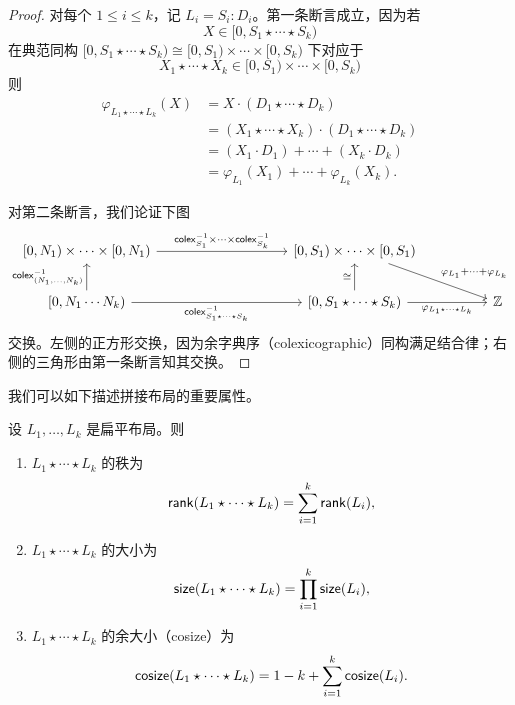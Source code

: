 \begin{proof}
    对每个 $1 \leq i \leq k$，记 $L_i = S_i:D_i$。第一条断言成立，因为若
    \[X \in [0,S_1 \star \cdots \star S_k)\]
    在典范同构 $[0,S_1 \star \cdots \star S_k) \cong [0,S_1) \times \cdots \times [0,S_k)$ 下对应于
    \[
    X_1 \star \cdots \star X_k \in [0,S_1) \times \cdots \times [0,S_k)
    \]
    则
    \begin{align*}
        \varphi_{L_1 \star \cdots \star L_k}(X) & = X \cdot (D_1 \star \cdots \star D_k)\\
        & = (X_1 \star \cdots \star X_k) \cdot (D_1 \star \cdots \star D_k)\\
        & = (X_1 \cdot D_1) + \cdots + (X_k \cdot D_k)\\
        & = \varphi_{L_1}(X_1) + \cdots + \varphi_{L_k}(X_k).
    \end{align*}

    对第二条断言，我们论证下图
    \[\begin{tikzcd} [row sep = 20]
    {[}0,N_1 {)} \times \cdots \times {[}0,N_1 {)} \ar[rrrr,"\colex_{S_1}^{-1} \times \cdots \times \colex_{S_k}^{-1} "] & & & & {[}0,S_1 {)} \times \cdots \times {[}0,S_1 {)} \ar[drr,"\varphi_{L_1} + \cdots + \varphi_{L_k}"] & & \\
    {[}0,N_1 \cdots N_k {)} \ar[u,"\colex_{(N_1,\dots,N_k)}^{-1}"] \ar[rrrr,swap,"\colex_{S_1\star \cdots \star S_k}^{-1}"] & & & & {[}0,S_1 \star \cdots \star S_k{)} \ar[rr,swap,"\varphi_{L_1 \star \cdots \star L_k}"] \ar[u,"\cong"] & & \mathbb{Z}
    \end{tikzcd} \]
    交换。左侧的正方形交换，因为余字典序（colexicographic）同构满足结合律；右侧的三角形由第一条断言知其交换。
\end{proof}

我们可以如下描述拼接布局的重要属性。

\begin{proposition}\label{attributesofconcatenatedflatlayouts}
    设 $L_1,\dots,L_k$ 是扁平布局。则
    \begin{enumerate}
        \item $L_1 \star \cdots \star L_k$ 的秩为 \[\mathsf{rank}(L_1 \star \cdots \star L_k)  = \sum_{i=1}^k\mathsf{rank}(L_i),\]
        \item $L_1 \star \cdots \star L_k$ 的大小为
        \[\mathsf{size}(L_1 \star \cdots \star L_k) = \prod_{i=1}^k\mathsf{size}(L_i),\]
        \item $L_1 \star \cdots \star L_k$ 的余大小（cosize）为
        \[\mathsf{cosize}(L_1 \star \cdots \star L_k) = 1 - k + \sum_{i=1}^k\mathsf{cosize}(L_i).\]
    \end{enumerate}
\end{proposition}

